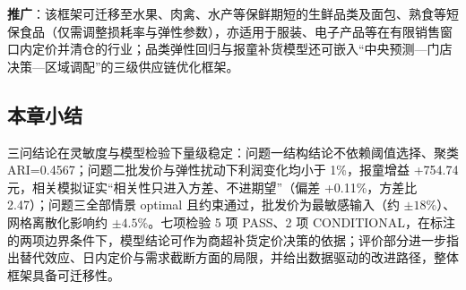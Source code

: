 \textbf{推广}：该框架可迁移至水果、肉禽、水产等保鲜期短的生鲜品类及面包、熟食等短保食品（仅需调整损耗率与弹性参数），亦适用于服装、电子产品等在有限销售窗口内定价并清仓的行业；品类弹性回归与报童补货模型还可嵌入“中央预测—门店决策—区域调配”的三级供应链优化框架。

\subsection*{本章小结}

三问结论在灵敏度与模型检验下量级稳定：问题一结构结论不依赖阈值选择、聚类 ARI=0.4567；问题二批发价与弹性扰动下利润变化均小于 1\%，报童增益 +754.74 元，相关模拟证实“相关性只进入方差、不进期望”（偏差 +0.11\%，方差比 2.47）；问题三全部情景 optimal 且约束通过，批发价为最敏感输入（约 $\pm18\%$）、网格离散化影响约 $\pm4.5\%$。七项检验 5 项 PASS、2 项 CONDITIONAL，在标注的两项边界条件下，模型结论可作为商超补货定价决策的依据；评价部分进一步指出替代效应、日内定价与需求截断方面的局限，并给出数据驱动的改进路径，整体框架具备可迁移性。
